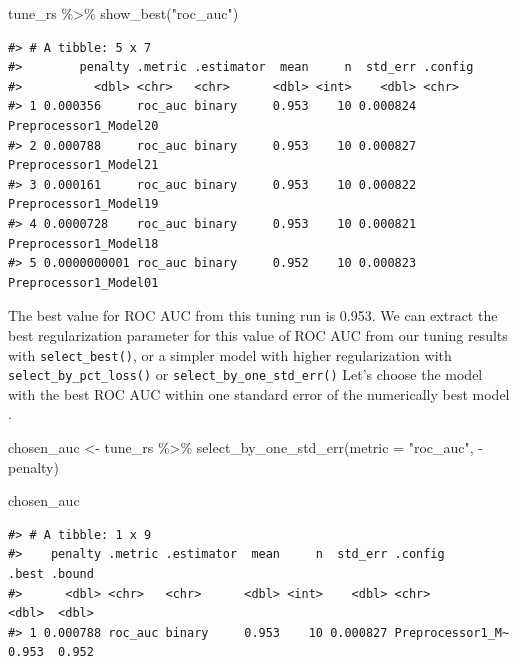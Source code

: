 \documentclass[
]{krantz}
\makeatletter
\newenvironment{Shaded}{\begin{snugshade}}{\end{snugshade}}
\newcommand{\AttributeTok}[1]{\textcolor[rgb]{0.77,0.63,0.00}{#1}}
\newcommand{\FunctionTok}[1]{\textcolor[rgb]{0.00,0.00,0.00}{#1}}
\newcommand{\NormalTok}[1]{#1}
\newcommand{\OtherTok}[1]{\textcolor[rgb]{0.56,0.35,0.01}{#1}}
\newcommand{\SpecialCharTok}[1]{\textcolor[rgb]{0.00,0.00,0.00}{#1}}
\newcommand{\StringTok}[1]{\textcolor[rgb]{0.31,0.60,0.02}{#1}}
\newenvironment{kframe}{%
\medskip{}
\setlength{\fboxsep}{.8em}
 \def\at@end@of@kframe{}%
 \ifinner\ifhmode%
  \def\at@end@of@kframe{\end{minipage}}%
  \begin{minipage}{\columnwidth}%
 \fi\fi%
 \def\FrameCommand##1{\hskip\@totalleftmargin \hskip-\fboxsep
 \colorbox{shadecolor}{##1}\hskip-\fboxsep
     \hskip-\linewidth \hskip-\@totalleftmargin \hskip\columnwidth}%
 \MakeFramed {\advance\hsize-\width
   \@totalleftmargin\z@ \linewidth\hsize
   \@setminipage}}%
 {\par\unskip\endMakeFramed%
 \at@end@of@kframe}
\renewenvironment{Shaded}{\begin{kframe}}{\end{kframe}}
\makeatother
\begin{document}
\begin{Shaded}
\begin{Highlighting}[]
\NormalTok{tune\_rs }\SpecialCharTok{\%\textgreater{}\%}
  \FunctionTok{show\_best}\NormalTok{(}\StringTok{"roc\_auc"}\NormalTok{)}
\end{Highlighting}
\end{Shaded}

\begin{verbatim}
#> # A tibble: 5 x 7
#>        penalty .metric .estimator  mean     n  std_err .config              
#>          <dbl> <chr>   <chr>      <dbl> <int>    <dbl> <chr>                
#> 1 0.000356     roc_auc binary     0.953    10 0.000824 Preprocessor1_Model20
#> 2 0.000788     roc_auc binary     0.953    10 0.000827 Preprocessor1_Model21
#> 3 0.000161     roc_auc binary     0.953    10 0.000822 Preprocessor1_Model19
#> 4 0.0000728    roc_auc binary     0.953    10 0.000821 Preprocessor1_Model18
#> 5 0.0000000001 roc_auc binary     0.952    10 0.000823 Preprocessor1_Model01
\end{verbatim}

The best value for ROC AUC from this tuning run is 0.953. We can extract the best regularization parameter for this value of ROC AUC from our tuning results with \texttt{select\_best()}, or a simpler model with higher regularization with \texttt{select\_by\_pct\_loss()} or \texttt{select\_by\_one\_std\_err()} Let's choose the model with the best ROC AUC within one standard error of the numerically best model \citep{Breiman1984}.

\begin{Shaded}
\begin{Highlighting}[]
\NormalTok{chosen\_auc }\OtherTok{\textless{}{-}}\NormalTok{ tune\_rs }\SpecialCharTok{\%\textgreater{}\%}
  \FunctionTok{select\_by\_one\_std\_err}\NormalTok{(}\AttributeTok{metric =} \StringTok{"roc\_auc"}\NormalTok{, }\SpecialCharTok{{-}}\NormalTok{penalty)}

\NormalTok{chosen\_auc}
\end{Highlighting}
\end{Shaded}

\begin{verbatim}
#> # A tibble: 1 x 9
#>    penalty .metric .estimator  mean     n  std_err .config          .best .bound
#>      <dbl> <chr>   <chr>      <dbl> <int>    <dbl> <chr>            <dbl>  <dbl>
#> 1 0.000788 roc_auc binary     0.953    10 0.000827 Preprocessor1_M~ 0.953  0.952
\end{verbatim}
\end{document}
